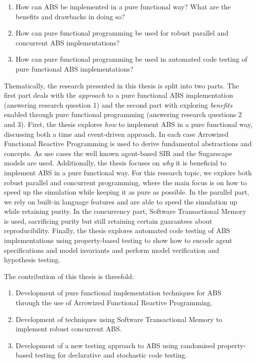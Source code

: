 \begin{enumerate}
	\item How can ABS be implemented in a pure functional way? What are the benefits and drawbacks in doing so?
	\item How can pure functional programming be used for robust parallel and concurrent ABS implementations? 
	\item How can pure functional programming be used in automated code testing of pure functional ABS implementations?
\end{enumerate}

Thematically, the research presented in this thesis is split into two parts. The first part deals with the \textit{approach} to a pure functional ABS implementation (answering research question 1) and the second part with exploring \textit{benefits} enabled through pure functional programming (answering research questions 2 and 3).
First, the thesis explores \textit{how} to implement ABS in a pure functional way, discussing both a time and event-driven approach. In each case Arrowized Functional Reactive Programming is used to derive fundamental abstractions and concepts. As use cases the well known agent-based SIR and the Sugarscape models are used. Additionally, the thesis focuses on \textit{why} it is beneficial to implement ABS in a pure functional way. For this research topic, we explore both robust parallel and concurrent programming, where the main focus is on how to speed up the simulation while keeping it as pure as possible. In the parallel part, we rely on built-in language features and are able to speed the simulation up while retaining purity. In the concurrency part, Software Transactional Memory is used, sacrificing purity but still retaining certain guarantees about reproducibility. Finally, the thesis explores automated code testing of ABS implementations using property-based testing to show how to encode agent specifications and model invariants and perform model verification and hypothesis testing.

The contribution of this thesis is threefold:
\begin{enumerate}
	\item Development of pure functional implementation techniques for ABS \\ through the use of Arrowized Functional Reactive Programming.
	\item Development of techniques using Software Transactional Memory to implement robust concurrent ABS.
	\item Development of a new testing approach to ABS using randomised property-based testing for declarative and stochastic code testing.
\end{enumerate}

